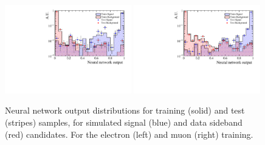 %
\begin{figure}[b]
\centering
\includegraphics[width=0.49\textwidth]{RKst/figs/Training/EE_wNB_TrainAndTest.pdf}
\includegraphics[width=0.49\textwidth]{RKst/figs/Training/MM_wNB_TrainAndTest.pdf}
\caption{Neural network output distributions for training (solid) and test (stripes) samples, for simulated 
signal (blue) and data sideband (red) candidates. For the electron (left) and muon (right) training.}
\label{fig:RKst_nnDist}
\end{figure}
%

